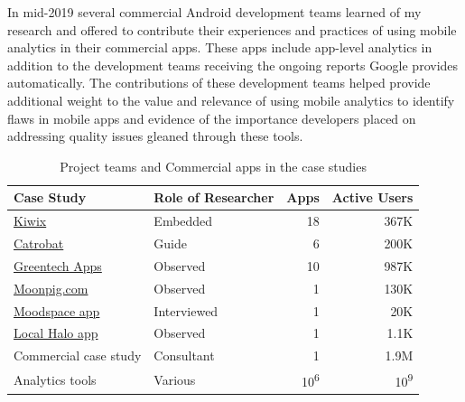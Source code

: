 In mid-2019 several commercial Android development teams learned of my research and offered to contribute their experiences and practices of using mobile analytics in their commercial apps. These apps include app-level analytics in addition to the development teams receiving the ongoing reports Google provides automatically. The contributions of these development teams helped provide additional weight to the value and relevance of using mobile analytics to identify flaws in mobile apps and evidence of the importance developers placed on addressing quality issues gleaned through these tools.


\begin{table}[htbp!]
    \centering
    \small
    \setlength{\tabcolsep}{4pt} %
    \begin{tabular}{llrr}
      Case Study &Role of Researcher &Apps &Active Users\\
      \hline
       \href{https://play.google.com/store/apps/dev?id=9116215767541857492&hl=en_GB}{Kiwix}  &Embedded &18 &367K\\
       \href{https://play.google.com/store/apps/developer?id=Catrobat&hl=en_GB}{Catrobat} &Guide &6 &200K\\
       \href{https://play.google.com/store/apps/dev?id=7665838187257770408}{Greentech Apps} &Observed &10 &987K\\
       \href{https://play.google.com/store/apps/developer?id=Moonpig.com&hl=en_GB}{Moonpig.com} &Observed &1 &130K\\
       \href{https://play.google.com/store/apps/details?id=boundless.moodgym&hl=en_GB}{Moodspace app} &Interviewed &1 &20K\\
       \href{https://play.google.com/store/apps/details?id=com.localhalo.app&hl=en_GB}{Local Halo app} &Observed &1 &1.1K\\
       Commercial case study &Consultant &1 &1.9M\\
       Analytics tools &Various &10\textsuperscript{6} &10\textsuperscript{9} \\
    \end{tabular}
    \caption{Project teams and Commercial apps in the case studies}
    \label{tab:case_studies}
\end{table}


